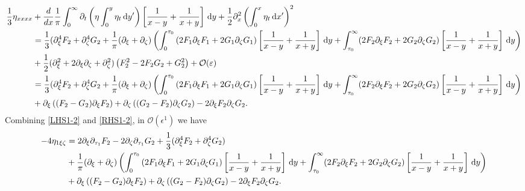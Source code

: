 \documentclass[10pt,reqno,oneside,a4paper, landscape]{article}
\begin{document}
\begin{align}
\frac{1}{3} \eta_{xxxx} &+ \frac{d}{dx} \frac{1}{\pi} \int_0^\infty \partial_t \left( \eta \int^{y}_0\eta_{t} \,\mathrm{d} y' \right) \left[ \frac{1}{x-y} + \frac{1}{x+y} \right] \,\mathrm{d} y + \frac{1}{2} \partial^2_x\left(\int^{x}_0\eta_{t} \,\mathrm{d} x' \right)^2 \nonumber\\
&= \frac{1}{3}(\partial_\xi^4 F_2 + \partial_\zeta^4 G_2 + \frac{1}{\pi} (\partial_\xi + \partial_\zeta) \left( \int_0^{\tau_0} \left( 2 F_1  \partial_\xi F_1 + 2 G_1 \partial_\zeta G_1 \right) \left[ \frac{1}{x-y} + \frac{1}{x+y} \right] \,\mathrm{d} y +\int_{\tau_0}^\infty (2 F_2 \partial_\xi F_2 + 2 G_2 \partial_\zeta G_2 )\left[ \frac{1}{x-y} + \frac{1}{x+y} \right] \,\mathrm{d} y \right) \nonumber \\
&+ \frac{1}{2} (\partial_\xi^2 + 2\partial_\xi \partial_\zeta + \partial_\zeta^2) \left( F^2_2 - 2F_2 G_2 + G_2^2 \right) + \mathcal{O}(\varepsilon) \nonumber \\
&=  \frac{1}{3}(\partial_\xi^4 F_2 + \partial_\zeta^4 G_2 + \frac{1}{\pi} (\partial_\xi + \partial_\zeta) \left( \int_0^{\tau_0} \left( 2 F_1  \partial_\xi F_1 + 2 G_1 \partial_\zeta G_1 \right) \left[ \frac{1}{x-y} + \frac{1}{x+y} \right] \,\mathrm{d} y +\int_{\tau_0}^\infty (2 F_2 \partial_\xi F_2 + 2 G_2 \partial_\zeta G_2 )\left[ \frac{1}{x-y} + \frac{1}{x+y} \right] \,\mathrm{d} y \right) \nonumber \\
&+ \partial_\xi\left( (F_2 - G_2)\partial_\xi F_2 \right)+  \partial_\zeta \left( (G_2 - F_2)\partial_\zeta G_2\right) - 2 \partial_\xi F_2 \partial_\zeta G_2. \label{RHS1-2}
\end{align}
Combining \eqref{LHS1-2} and \eqref{RHS1-2}, in $\mathcal{O}(\epsilon^1)$ we have
\begin{equation}\label{srfceqHL2-2}
\begin{aligned}
- 4\eta_{1\xi \zeta} &= 2 \partial_\xi \partial_{\tau_1}F_2 - 2\partial_{\zeta} \partial_{\tau_1}G_2  + \frac{1}{3}(\partial_\xi^4 F_2 + \partial_\zeta^4 G_2) \\
&+ \frac{1}{\pi} (\partial_\xi + \partial_\zeta) \left( \int_0^{\tau_0} \left( 2 F_1  \partial_\xi F_1 + 2 G_1 \partial_\zeta G_1 \right) \left[ \frac{1}{x-y} + \frac{1}{x+y} \right] \,\mathrm{d} y +\int_{\tau_0}^\infty (2 F_2 \partial_\xi F_2 + 2 G_2 \partial_\zeta G_2 )\left[ \frac{1}{x-y} + \frac{1}{x+y} \right] \,\mathrm{d} y \right) \\
&+ \partial_\xi\left( (F_2 - G_2)\partial_\xi F_2 \right)+  \partial_\zeta \left( (G_2 - F_2)\partial_\zeta G_2\right) - 2 \partial_\xi F_2 \partial_\zeta G_2.
\end{aligned}
\end{equation}
\end{document}
